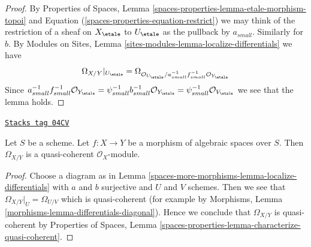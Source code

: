 \begin{proof}
By
Properties of Spaces, Lemma \ref{spaces-properties-lemma-etale-morphism-topoi}
and Equation (\ref{spaces-properties-equation-restrict})
we may think of the restriction of a sheaf on $X_\etale$ to
$U_\etale$ as the pullback by $a_{small}$. Similarly for $b$. By
Modules on Sites, Lemma \ref{sites-modules-lemma-localize-differentials}
we have
$$
\Omega_{X/Y}|_{U_\etale} =
\Omega_{\mathcal{O}_{U_\etale}/
a_{small}^{-1}f_{small}^{-1}\mathcal{O}_{Y_\etale}}
$$
Since $a_{small}^{-1}f_{small}^{-1}\mathcal{O}_{Y_\etale}
= \psi_{small}^{-1}b_{small}^{-1}\mathcal{O}_{Y_\etale}
= \psi_{small}^{-1}\mathcal{O}_{V_\etale}$ we see that the lemma holds.
\end{proof}

\begin{lemma}
\label{spaces-more-morphisms-lemma-module-differentials-quasi-coherent}
\href{https://stacks.math.columbia.edu/tag/04CV}{\texttt{Stacks tag 04CV}}

Let $S$ be a scheme. Let $f : X \to Y$ be a morphism of algebraic spaces
over $S$. Then $\Omega_{X/Y}$ is a quasi-coherent $\mathcal{O}_X$-module.
\end{lemma}

\begin{proof}
Choose a diagram as in
Lemma \ref{spaces-more-morphisms-lemma-localize-differentials}
with $a$ and $b$ surjective and $U$ and $V$ schemes.
Then we see that $\Omega_{X/Y}|_U = \Omega_{U/V}$ which is
quasi-coherent (for example by
Morphisms, Lemma \ref{morphisms-lemma-differentials-diagonal}).
Hence we conclude that $\Omega_{X/Y}$ is quasi-coherent by
Properties of Spaces,
Lemma \ref{spaces-properties-lemma-characterize-quasi-coherent}.
\end{proof}

